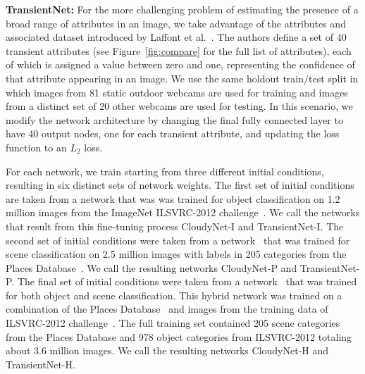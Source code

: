 \documentclass[10pt,twocolumn,letterpaper]{article}
\newcommand{\todo}[1]{\textcolor{red}{todo: {\em #1}}}
\newcommand{\figref}[1]{Figure~\ref{fig:#1}}
\begin{document}
\textbf{TransientNet:} For the more challenging problem of estimating
the presence of a broad range of attributes in an image, we take
advantage of the attributes and associated dataset introduced by Laffont
et al.~\cite{Laffont14}. The authors define a set of 40 transient attributes
(see \figref{compare} for the full list of attributes), each of which is
assigned a value between zero and one, representing the confidence
of that attribute appearing in an image. We use the same holdout
train/test split in which images from 81 static outdoor webcams are
used for training and images from a distinct set of 20 other webcams are
used for testing.  In this scenario, we modify the network architecture
by changing the final fully connected layer to have 40 output nodes, one for
each transient attribute, and updating the loss function to an $L_2$
loss. 

For each network, we train starting from three different initial conditions,
resulting in six distinct sets of network weights. The first set of initial
conditions are taken from a network that was was trained for object
classification on 1.2 million images from the ImageNet ILSVRC-2012
challenge~\cite{ILSVRCarxiv14}.  We call the networks that result from this
fine-tuning process CloudyNet-I and TransientNet-I.  The second set of initial
conditions were taken from a network~\cite{zhou2014places} that was trained for
scene classification on 2.5 million images with labels in 205 categories from
the Places Database~\cite{zhou2014places}. We call the resulting networks
CloudyNet-P and TransientNet-P.  The final set of initial conditions were taken
from a network~\cite{zhou2014places} that was trained for both object and scene
classification.  This hybrid network was trained on a combination of the Places
Database~\cite{zhou2014places} and images from the training data of ILSVRC-2012
challenge~\cite{ILSVRCarxiv14}.  The full training set contained 205 scene
categories from the Places Database and 978 object categories from ILSVRC-2012
totaling about 3.6 million images.  We call the resulting networks CloudyNet-H
and TransientNet-H.

%
\end{document}
